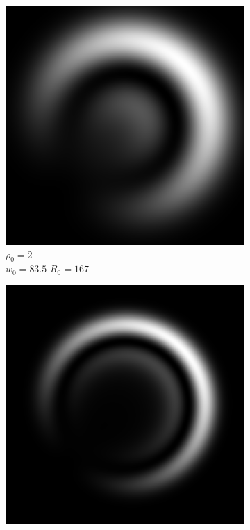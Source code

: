 \documentclass[11pt, a4paper, twoside]{article} %
\begin{document}
\begin{figure}[h!] 
     \centering 
    \begin{subfigure}[b]{0.245\linewidth}
    \includegraphics[width=\linewidth]{simul41.png}
    \caption{$\rho_0=2$\\ $w_0=83.5$ $R_0=167$}
     \end{subfigure}
 \begin{subfigure}[b]{0.245\linewidth}
     \includegraphics[width=\linewidth]{simul42.png}

\end{subfigure}
\end{figure}
\end{document}
